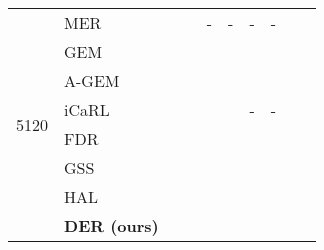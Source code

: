 \documentclass{article}
\begin{document}
\begin{table}[H]
{{\begin{tabular}{clcccccccc}
                        & MER                   &   \tiny{}        &   \tiny{}        & -                                                                  & -                                                                & -                                                                     & -                       \\
                        & GEM                   &   \tiny{}                                  &   \tiny{}                                  & \tiny{}                                           &  \tiny{}                                          &  \tiny{}                                               &  \tiny{} \\
                        & A-GEM                 & \tiny{}                                  &   \tiny{}                                  & \tiny{}                                           &  \tiny{}                                          & \tiny{}                                               & \tiny{} \\              
\multirow{2}{*}{5120}   & iCaRL                 &  \tiny{}                                  &   \tiny{}                                  & \tiny{}                                           &   \tiny{}                                          & -                                                                     & -                       \\
                        & FDR                   &  \tiny{}                                  &   \tiny{}                                  & \tiny{}                                           &   \tiny{}                                          &  \tiny{}                                               &  \tiny{} \\
                        & GSS                   &   \tiny{}                                  &   \tiny{}                                  & \tiny{}                                            & \tiny{}                                             & \tiny{}                                                &   \tiny{} \\
                        & HAL                   &   \tiny{}                                  &   \tiny{}                                  & \tiny{}                                           &   \tiny{}                                          & \tiny{}                                               & \tiny{} \\
                        & \textbf{DER (ours)}   &   \tiny{}                                  &   \tiny{}                                  & \tiny{}                                           &   \tiny{}                                          &  \tiny{}                                               &  \tiny{} \\

\end{tabular}}}
\end{table}
\end{document}
